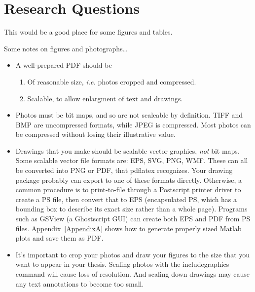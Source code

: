 \chapter{Research Questions}

This would be a good place for some figures and tables.

Some notes on figures and photographs\ldots

\begin{itemize}
\item A well-prepared PDF should be 
  \begin{enumerate}
    \item Of reasonable size, {\it i.e.} photos cropped and compressed.
    \item Scalable, to allow enlargment of text and drawings. 
  \end{enumerate} 
\item Photos must be bit maps, and so are not scaleable by definition. TIFF and
BMP are uncompressed formats, while JPEG is compressed. Most photos can be
compressed without losing their illustrative value.
\item Drawings that you make should be scalable vector graphics, \emph{not} 
bit maps. Some scalable vector file formats are: EPS, SVG, PNG, WMF. These can
all be converted into PNG or PDF, that pdflatex recognizes. Your drawing 
package probably can export to one of these formats directly. Otherwise, a 
common procedure is to print-to-file through a Postscript printer driver to 
create a PS file, then convert that to EPS (encapsulated PS, which has a 
bounding box to describe its exact size rather than a whole page). 
Programs such as GSView (a Ghostscript GUI) can create both EPS and PDF from PS files.
Appendix~\ref{AppendixA} shows how to generate properly sized Matlab plots and save them as PDF.
\item It's important to crop your photos and draw your figures to the size that
you want to appear in your thesis. Scaling photos with the 
includegraphics command will cause loss of resolution. And scaling down 
drawings may cause any text annotations to become too small.
\end{itemize}
 
